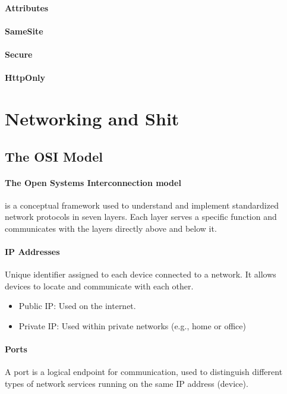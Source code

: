 \documentclass[a4paper]{article}
\begin{document}
        \paragraph{Attributes}
        \paragraph{SameSite}
        \paragraph{Secure}
        \paragraph{HttpOnly}
    
    \section{Networking and Shit}
    \subsection{The OSI Model}

    \paragraph{The Open Systems Interconnection model} is a conceptual framework used to understand and implement standardized network protocols in seven layers. Each layer serves a specific function and communicates with the layers directly above and below it.

    \paragraph{IP Addresses} Unique identifier assigned to each device connected to a network. It allows devices to locate and communicate with each other.

    \begin{itemize}
        \item Public IP: Used on the internet.
        \item Private IP: Used within private networks (e.g., home or office)
    \end{itemize}

    \paragraph*{Ports} A port is a logical endpoint for communication, used to distinguish different types of network services running on the same IP address (device). 
\end{document}
